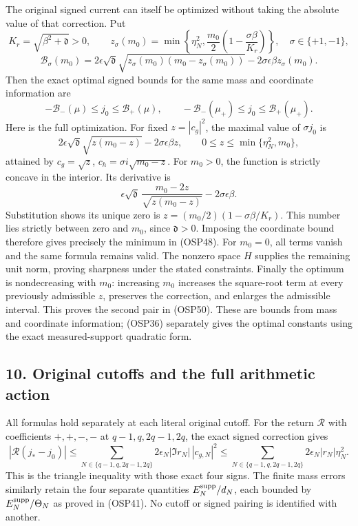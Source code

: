 \documentclass[
]{article}
\begin{document}
The original signed current can itself be optimized without taking the
absolute value of that correction. Put \[
K_r=\sqrt{\beta^2+\mathfrak d}>0,\qquad
z_\sigma(m_0)=\min\left\{\eta_N^2,
\frac{m_0}{2}\left(1-\frac{\sigma\beta}{K_r}\right)\right\},
\quad\sigma\in\{+1,-1\},
\tag{OSP48}
\] \[
\mathcal B_\sigma(m_0)=
2\epsilon\sqrt{\mathfrak d}
\sqrt{z_\sigma(m_0)(m_0-z_\sigma(m_0))}
-2\sigma\epsilon\beta z_\sigma(m_0).
\tag{OSP49}
\] Then the exact optimal signed bounds for the same mass and coordinate
information are \[
-\mathcal B_-(\mu)\le j_0\le\mathcal B_+(\mu),
\qquad
-\mathcal B_-(\mu_+)\le j_0\le\mathcal B_+(\mu_+).
\tag{OSP50}
\] Here is the full optimization. For fixed \(z=|c_g|^2\), the maximal
value of \(\sigma j_0\) is \[
2\epsilon\sqrt{\mathfrak d}\sqrt{z(m_0-z)}-2\sigma\epsilon\beta z,
\qquad0\le z\le\min\{\eta_N^2,m_0\},
\] attained by \(c_g=\sqrt z\), \(c_h=\sigma i\sqrt{m_0-z}\). For
\(m_0>0\), the function is strictly concave in the interior. Its
derivative is \[
\epsilon\sqrt{\mathfrak d}\,
\frac{m_0-2z}{\sqrt{z(m_0-z)}}-2\sigma\epsilon\beta.
\] Substitution shows its unique zero is
\(z=(m_0/2)(1-\sigma\beta/K_r)\). This number lies strictly between zero
and \(m_0\), since \(\mathfrak d>0\). Imposing the coordinate bound
therefore gives precisely the minimum in (OSP48). For \(m_0=0\), all
terms vanish and the same formula remains valid. The nonzero space \(H\)
supplies the remaining unit norm, proving sharpness under the stated
constraints. Finally the optimum is nondecreasing with \(m_0\):
increasing \(m_0\) increases the square-root term at every previously
admissible \(z\), preserves the correction, and enlarges the admissible
interval. This proves the second pair in (OSP50). These are bounds from
mass and coordinate information; (OSP36) separately gives the optimal
constants using the exact measured-support quadratic form.

\subsection{10. Original cutoffs and the full arithmetic
action}\label{original-cutoffs-and-the-full-arithmetic-action}

All formulas hold separately at each literal original cutoff. For the
return \(\mathcal R\) with coefficients \(+,+,-,-\) at
\(q-1,q,2q-1,2q\), the exact signed correction gives \[
\left|\mathcal R(j_*-j_0)\right|
\le\sum_{N\in\{q-1,q,2q-1,2q\}}
2\epsilon_N|\Im r_N|\,|c_{g,N}|^2
\le\sum_{N\in\{q-1,q,2q-1,2q\}}
2\epsilon_N|r_N|\eta_N^2.
\tag{OSP51}
\] This is the triangle inequality with those exact four signs. The
finite mass errors similarly retain the four separate quantities
\(E_N^{\rm supp}/d_N\), each bounded by \(E_N^{\rm supp}/\Theta_N\) as
proved in (OSP41). No cutoff or signed pairing is identified with
another.
\end{document}
